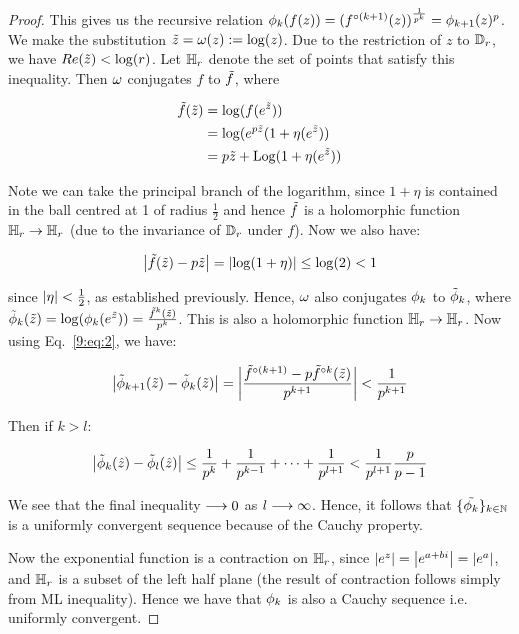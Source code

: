\documentclass[../main.tex]{subfiles}
\begin{document}
\begin{proof}
This gives us the recursive relation $\phi_k(f(z)) = (f^{\circ(k+1)}(z))^{\frac{1}{p^k}} = \phi_{k+1}(z)^{p}$. We make the substitution $\tilde{z} = \omega(z) := \log(z)$. Due to the restriction of $z$ to $\mathbb{D}_r$, we have $Re(\tilde{z})<\log(r)$. Let $\mathbb{H}_r$ denote the set of points that satisfy this inequality. Then $\omega$ conjugates $f$ to $\tilde{f}$, where

\begin{align*}
    \tilde{f}(\tilde{z}) & = \log(f(e^{\tilde{z}})) \\
    & = \log(e^{p\tilde{z}}(1+\eta(e^{\tilde{z}})) \\
    & = p\tilde{z}+\mathrm{Log}(1+\eta(e^{\tilde{z}}))
\end{align*}

Note we can take the principal branch of the logarithm, since $1+\eta$ is contained in the ball centred at 1 of radius $\frac{1}{2}$ and hence $\tilde{f}$ is a holomorphic function $\mathbb{H}_r \to \mathbb{H}_r$ (due to the invariance of $\mathbb{D}_r$ under $f$). Now we also have: 

\begin{equation}
    \label{9:eq:2}
    \left|\tilde{f}(\tilde{z})-p\tilde{z}\right| = \left|\log(1+\eta)\right| \leq \log(2) < 1
\end{equation}

since $\left|\eta\right| < \frac{1}{2}$, as established previously. Hence, $\omega$ also conjugates $\phi_k$ to $\tilde{\phi}_k$, where $\tilde{\phi}_k(\tilde{z}) = \log(\phi_k(e^{\tilde{z}}))=\frac{\tilde{f}^{k}(\tilde{z})}{p^k}$. This is also a holomorphic function $\mathbb{H}_r\to\mathbb{H}_r$. Now using Eq.~\ref{9:eq:2}, we have:

$$
\left|\tilde{\phi}_{k+1}(\tilde{z}) - \tilde{\phi}_{k}(\tilde{z})\right|=\left|\frac{\tilde{f}^{\circ(k+1)}-p\tilde{f}^{\circ k}(\tilde{z})}{p^{k+1}}\right| < \frac{1}{p^{k+1}}
$$


Then if $k>l$:

$$\left|\tilde{\phi}_{k}(\hat{z}) - \tilde{\phi}_{l}(\hat{z})\right|\leq \frac{1}{p^k}+\frac{1}{p^{k-1}}+\dots+\frac{1}{p^{l+1}}<\frac{1}{p^{l+1}}\frac{p}{p-1}$$

We see that the final inequality $\longrightarrow 0$ as $l \longrightarrow \infty$. Hence, it follows that $\{\tilde{\phi_k}\}_{k\in \mathbb{N}}$ is a uniformly convergent sequence because of the Cauchy property.

Now the exponential function is a contraction on $\mathbb{H}_r$, since $\left|e^z\right|=\left|e^{a+bi}\right|=\left|e^a\right|$, and $\mathbb{H}_r$ is a subset of the left half plane (the result of contraction follows simply from ML inequality). Hence we have that $\phi_k$ is also a Cauchy sequence i.e. uniformly convergent.


\end{proof}
\end{document}
